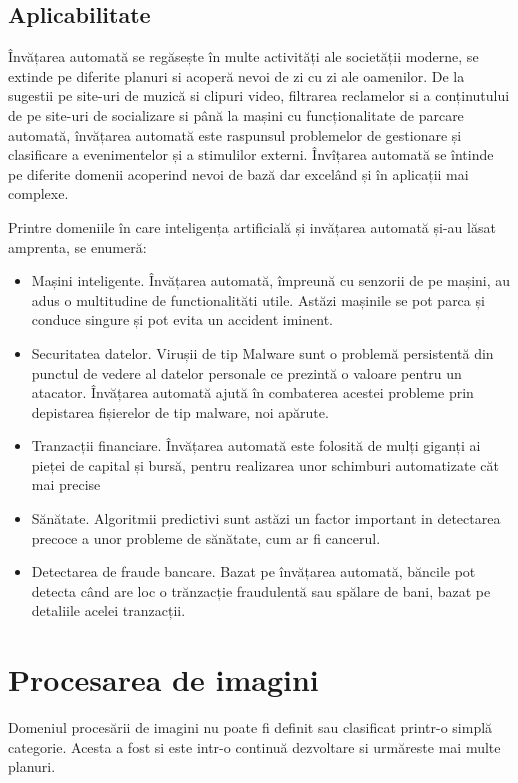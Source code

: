 	\subsection{Aplicabilitate}
	Învățarea automată se regăsește în multe activități ale societății moderne, se extinde pe diferite planuri si acoperă nevoi de zi cu zi ale oamenilor. De la sugestii pe site-uri de muzică si clipuri video, filtrarea reclamelor si a conținutului de pe site-uri de socializare  si până la mașini cu funcționalitate de parcare automată, învățarea automată este raspunsul problemelor de gestionare și clasificare a evenimentelor și a stimulilor externi. 
	Învîțarea automată se întinde pe diferite domenii acoperind nevoi de bază dar excelând și în aplicații mai complexe.
	
	Printre domeniile în care inteligența artificială și invățarea automată și-au lăsat amprenta, se enumeră:
	
	\begin{itemize}
		\item Mașini inteligente. Învățarea automată, împreună cu senzorii de pe mașini, au adus o multitudine de functionalităti utile. Astăzi mașinile se pot parca și conduce singure și pot evita un accident iminent.
		
		\item Securitatea datelor. Virușii de tip Malware sunt o problemă persistentă din punctul de vedere al datelor personale ce prezintă o valoare pentru un atacator. Învățarea automată ajută în combaterea acestei probleme prin depistarea fișierelor de tip malware, noi apărute.
		
		\item Tranzacții financiare. Învățarea automată este folosită de mulți giganți ai pieței de capital și bursă, pentru realizarea unor schimburi automatizate căt mai precise
		
		\item Sănătate. Algoritmii predictivi sunt astăzi un factor important in detectarea precoce a unor probleme de sănătate, cum ar fi cancerul.
		
		\item Detectarea de fraude bancare. Bazat pe învățarea automată, băncile pot detecta când are loc o trănzacție fraudulentă sau spălare de bani, bazat pe detaliile acelei tranzacții.			
	\end{itemize}
	
	\vfill
	
	
	\section{Procesarea de imagini}
	Domeniul procesării de imagini nu poate fi definit sau clasificat printr-o simplă categorie. Acesta a fost si este intr-o continuă dezvoltare si urmăreste mai multe planuri. 
	
